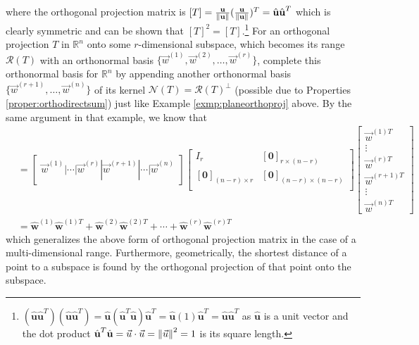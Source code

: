 where the orthogonal projection matrix is $[T] = \frac{\textbf{u}}{\norm{\textbf{u}}}(\frac{\textbf{u}}{\norm{\textbf{u}}})^T = \hat{\textbf{u}}\hat{\textbf{u}}^T$ which is clearly symmetric and can be shown that $[T]^2 = [T]$.\footnote{$(\hat{\textbf{u}}\hat{\textbf{u}}^T)(\hat{\textbf{u}}\hat{\textbf{u}}^T) = \hat{\textbf{u}}(\hat{\textbf{u}}^T\hat{\textbf{u}})\hat{\textbf{u}}^T = \hat{\textbf{u}}(1)\hat{\textbf{u}}^T = \hat{\textbf{u}}\hat{\textbf{u}}^T$ as $\hat{\textbf{u}}$ is a unit vector and the dot product $\hat{\textbf{u}}^T\hat{\textbf{u}} = \vec{u}\cdot\vec{u} = \norm{\vec{u}}^2 = 1$ is its square length.} For an orthogonal projection $T$ in $\mathbb{R}^n$ onto some $r$-dimensional subspace, which becomes its range $\mathcal{R}(T)$ with an orthonormal basis $\{\vec{w}^{(1)}, \vec{w}^{(2)}, \ldots, \vec{w}^{(r)}\}$, complete this orthonormal basis for $\mathbb{R}^n$ by appending another orthonormal basis $\{\vec{w}^{(r+1)}, \ldots, \vec{w}^{(n)}\}$ of its kernel $\mathcal{N}(T) = \mathcal{R}(T)^\perp$ (possible due to Properties \ref{proper:orthodirectsum}) just like Example \ref{exmp:planeorthoproj} above. By the same argument in that example, we know that
\begin{align}
[T] &= 
\begin{bmatrix}
\vec{w}^{(1)}|\cdots|\vec{w}^{(r)}|\vec{w}^{(r+1)}|\cdots|\vec{w}^{(n)}
\end{bmatrix}
\begin{bmatrix}
I_r & [\textbf{0}]_{r\times(n-r)} \\
[\textbf{0}]_{(n-r)\times r} & [\textbf{0}]_{(n-r)\times(n-r)} \\
\end{bmatrix}
\left[\begin{array}{c} 
\vec{w}^{(1)T} \\
\hline
\vdots \\
\hline
\vec{w}^{(r)T} \\
\hline
\vec{w}^{(r+1)T} \\
\hline 
\vdots \\
\hline
\vec{w}^{(n)T}
\end{array}\right] \nonumber \\
&= \hat{\textbf{w}}^{(1)}\hat{\textbf{w}}^{(1)T} + \hat{\textbf{w}}^{(2)}\hat{\textbf{w}}^{(2)T} + \cdots + \hat{\textbf{w}}^{(r)}\hat{\textbf{w}}^{(r)T} \label{eqn:projrank1sum}
\end{align}
which generalizes the above form of orthogonal projection matrix in the case of a multi-dimensional range. Furthermore, geometrically, the shortest distance of a point to a subspace is found by the orthogonal projection of that point onto the subspace.
